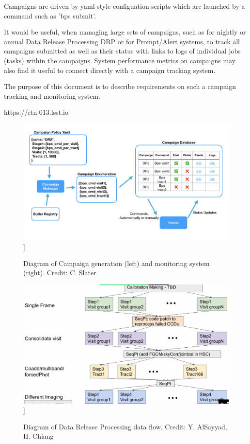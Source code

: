 \documentclass[DM,authoryear,toc]{lsstdoc}
\begin{document}
Campaigns are driven by yaml-style configuation scripts which are launched
by a command such as 'bps submit'.

It would be useful, when managing large sets of campaigns, such as for
nightly or annual Data Release Processing DRP or for Prompt/Alert systems, 
to track all campaigns submitted as well as their status with links to
logs of individual jobs (tasks) within the campaigns.  System performance
metrics on campaigns may also find it useful to connect directly with
a campaign tracking system.

The purpose of this document is to describe requirements on such a campaign
tracking and monitoring system.

https://rtn-013.lsst.io


\begin{figure}
\includegraphics[width=\textwidth]{CampaignTooling.jpg}]
\caption{Diagram of Campaign generation (left) and monitoring system (right).
Credit: C. Slater}
\end{figure}

\begin{figure}
\includegraphics[width=\textwidth]{analdrp.png}]
\caption{Diagram of Data Release Processing data flow.
Credit: Y. AlSayyad, H. Chiang}
\end{figure}
\end{document}
